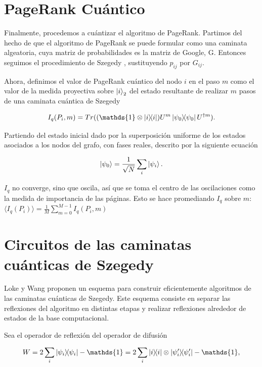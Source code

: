 \section{PageRank Cuántico}

Finalmente, procedemos a cuántizar el algoritmo de PageRank. Partimos del hecho de que el algoritmo de PageRank se puede formular como una caminata algeatoria, cuya matriz de probabilidades es la matriz de Google, G. Entonces seguimos el procedimiento de Szegedy \cite{Paparo_2012, Santos_2016}, sustituyendo $p_{i j}$ por $G_{i j}$.

Ahora, definimos el valor de PageRank cuántico del nodo $i$ en el paso $m$ como el valor de la medida proyectiva sobre $\ket{i}_2$ del estado resultante de realizar $m$ pasos de una caminata cuántica de Szegedy

\begin{equation}
    I_q(P_i,m) =  Tr((\mathds{1} \otimes \ketbra{i}{i}) U^m \ketbra{\psi_0} U^{\dagger m}) .
\end{equation}

Partiendo del estado inicial dado por la superposición uniforme de los estados asociados a los nodos del grafo, con fases reales, descrito por la siguiente ecuación

\begin{equation}
    \ket{\psi_0} = \frac{1}{\sqrt{N}} \sum\limits_i \ket{\psi_i} .
\end{equation}

$I_q$ no converge, sino que oscila, así que se toma el centro de las oscilaciones como la medida de importancia de las páginas. Esto se hace promediando $I_q$ sobre $m$: $\langle I_q(P_i) \rangle = \frac{1}{M} \sum\limits_{m=0}^{M-1} I_q(P_i,m)$ 

\section{Circuitos de las caminatas cuánticas de Szegedy}

Loke y Wang \cite{loke} proponen un esquema para construir eficientemente algoritmos de las caminatas cuánticas de Szegedy. Este esquema consiste en separar las reflexiones del algoritmo en distintas etapas y realizar reflexiones alrededor de estados de la base computacional.

Sea el operador de reflexión del operador de difusión

\begin{equation}
    W = 2 \sum\limits_i \ketbra{\psi_i}{\psi_i} - \mathds{1} = 2 \sum\limits_i \ketbra{i}{i} \otimes \ketbra{\psi_i^\prime}{\psi_i^\prime} - \mathds{1} ,
\end{equation}

